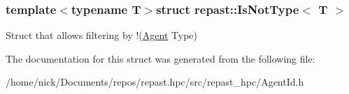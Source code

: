 \subsubsection*{template$<$typename T$>$struct repast\-::\-Is\-Not\-Type$<$ T $>$}

Struct that allows filtering by !(\hyperlink{classrepast_1_1_agent}{Agent} Type) 

The documentation for this struct was generated from the following file\-:\begin{DoxyCompactItemize}
\item 
/home/nick/\-Documents/repos/repast.\-hpc/src/repast\-\_\-hpc/Agent\-Id.\-h\end{DoxyCompactItemize}
